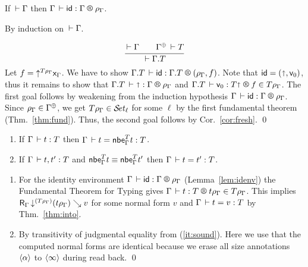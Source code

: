\documentclass[acmlarge,review,anonymous]{acmart}\settopmatter{printfolios=true}
\makeatletter
\newenvironment{proof*}[1][\proofname]{\par
  \normalfont \topsep6\p@\@plus6\p@\relax
  \trivlist
  \item[\@proofindent\hskip\labelsep
        {\@proofnamefont #1\@addpunct{.}}]\ignorespaces
}{%
  \endtrivlist\@endpefalse
}
\makeatother
\begin{document}
\begin{lemma}
  \label{lem:idenv}
  If\/ $\der \Gamma$ then
  $\LRS \Gamma \sid \Gamma \rhog$.
\end{lemma}
\begin{proof*}
  By induction on $\der \Gamma$.
\begin{caselist}

\nextcase
\[
  \ru{\der \Gamma \qquad \resurrect\Gamma \der T
    }{\der \cext \Gamma T}
\]
Let $f = \up{T\rhog} \var\Gamma$.
We have to show $\LRS{\cext \Gamma T} \sid {\cext\Gamma T} {(\rhog, f)}$.
Note that $\sid = (\slift,\ind0)$, thus it remains to show that
$\LRS {\cext \Gamma T} {\slift} \Gamma \rhog$ and
$\LR {\cext \Gamma T} {\ind0} {T\slift} f {T\rhog}$.
The first goal follows by weakening from the induction hypothesis
$\LRS \Gamma \sid \Gamma \rhog$.
Since $\rhog \in \resurrect\Gamma$, we get $T \rhog \in \SET[\ell]$ for some $\ell$
by the first fundamental theorem (Thm.~\ref{thm:fund}).
Thus, the second goal follows by Cor.~\ref{cor:fresh}.
\qed
\end{caselist}
\end{proof*}

\begin{corollary}
  \label{cor:soundnbe} \bla
  \begin{enumerate}
  \item \label{it:sound}
  If\/ $\Gamma \der t : T$ then $\Gamma \der t = \nbe \Gamma T t : T$.
  \item
  If\/ $\Gamma \der t,t' : T$ and $\nbe \Gamma T t \equiv \nbe \Gamma T {t'}$ then
  $\Gamma \der t = t' : T$.
  \end{enumerate}
\end{corollary}
\begin{proof*}
\bla
\begin{enumerate}

\item For the identity environment $\LRS \Gamma \sid \Gamma \rhog$ (Lemma~\ref{lem:idenv})
the Fundamental Theorem for Typing gives $\LR \Gamma t T {t\rhog} {T\rhog}$.
This implies $\R \Gamma {\down{(T\rhog)} (t\rhog)} v$ for some normal form $v$ and
$\Gamma \der t = v : T$ by Thm.~\ref{thm:into}.

\item By transitivity of judgmental equality from (\ref{it:sound}).
   Here we use that the computed normal forms are identical because
   we erase all size annotations $\ann\alpha$ to $\ann\infty$ during read back.
\qed
\end{enumerate}
\end{proof*}
\end{document}
